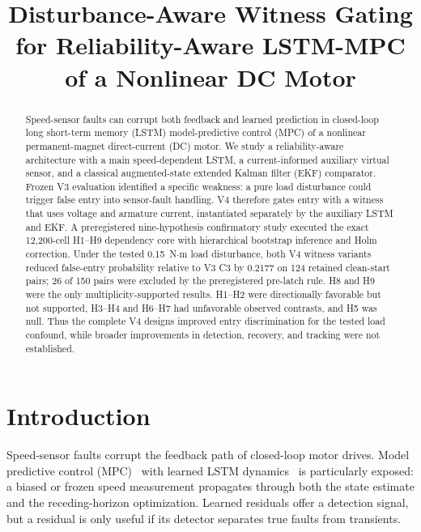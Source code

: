 \documentclass[conference]{IEEEtran}
\title{Disturbance-Aware Witness Gating for Reliability-Aware LSTM-MPC of a Nonlinear DC Motor}
\author{
  \IEEEauthorblockN{Lakshya Lalan\IEEEauthorrefmark{1} and Shashwat Kansal\IEEEauthorrefmark{1}}
  \IEEEauthorblockA{\IEEEauthorrefmark{1}Department of Electronics and Communication Engineering,\\
  Vellore Institute of Technology, Vellore, India}
}
\begin{document}
\maketitle
\raggedbottom
\setlength{\dblfloatsep}{2pt}

\begin{abstract}
Speed-sensor faults can corrupt both feedback and learned prediction in
closed-loop long short-term memory (LSTM) model-predictive control (MPC) of a nonlinear permanent-magnet
direct-current (DC) motor. We study a reliability-aware architecture with a main
speed-dependent LSTM, a current-informed auxiliary virtual sensor, and a
classical augmented-state extended Kalman filter (EKF) comparator. Frozen V3
evaluation identified a specific weakness: a pure load disturbance could
trigger false entry into sensor-fault handling. V4 therefore gates entry
with a witness that uses voltage and armature current, instantiated
separately by the auxiliary LSTM and EKF. A preregistered nine-hypothesis
confirmatory study executed the exact 12{,}200-cell H1--H9 dependency core
with hierarchical bootstrap inference and Holm correction. Under the tested
0.15~N$\cdot$m load disturbance, both V4 witness variants reduced
false-entry probability relative to V3 C3 by 0.2177 on 124 retained
clean-start pairs; 26 of 150 pairs were excluded by the preregistered
pre-latch rule. H8 and H9 were the only multiplicity-supported results.
H1--H2 were directionally favorable but not
supported, H3--H4 and H6--H7 had unfavorable observed contrasts, and H5 was
null. Thus the complete V4 designs improved entry discrimination for the tested load
confound, while broader improvements in detection, recovery, and tracking
were not established.
\end{abstract}

\section{Introduction}
\label{sec:intro}

Speed-sensor faults corrupt the feedback path of closed-loop motor drives.
Model predictive control (MPC)~\cite{Mayne2000} with learned LSTM
dynamics~\cite{Hochreiter1997} is particularly exposed: a
biased or frozen speed measurement propagates through both the state
estimate and the receding-horizon optimization. Learned residuals offer a
detection signal, but a residual is only useful if its detector separates
true faults from transients.
\end{document}
